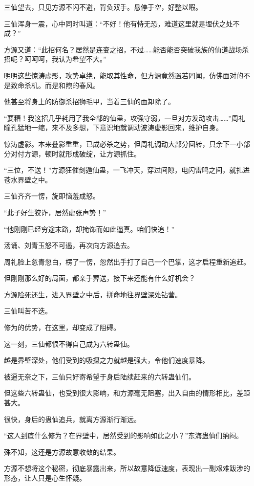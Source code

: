 \begin{this_body}
三仙望去，只见方源不闪不避，背负双手。悬停于空，好整以暇。

三仙浑身一震，心中同时叫道：“不好！他有恃无恐，难道这里就是埋伏之处不成？”

方源又道：“此招何名？居然是连变之招，不过……能否能否突破我族的仙道战场杀招呢？呵呵呵，我认为希望不大。”

明明这些惊涛虚影，攻势卓绝，能取其性命，但方源竟然置若罔闻，仿佛面对的不是致命杀机。而是和煦的春风。

他甚至将身上的防御杀招狮毛甲，当着三仙的面卸除了。

“要糟！我这招几乎耗用了我全部的仙蛊，攻强守弱，一旦对方发动攻击……”周礼瞳孔猛地一缩，来不及多想，下意识地就调动波涛虚影回来，维护自身。

惊涛虚影。本来叠影重重，已成必杀之势，但周礼调动大部分回转，只余下一小部分对付方源，顿时就形成破绽，让方源抓住。

“三位，不送！”方源狂催剑遁仙蛊，一飞冲天，穿过间隙，电闪雷鸣之间，就扎进苍水界壁之中。

三仙齐齐一愣，旋即恼羞成怒。

“此子好生狡诈，居然虚张声势！”

“他刚刚已经穷途末路，却掩饰而如此逼真。咱们快追！”

汤诵、刘青玉怒不可遏，再次向方源追去。

周礼脸上忽青忽白，楞了一愣，忽然出手打了自己一个巴掌，这才启程重新追赶。

但刚刚那么好的局面，都亲手葬送，接下来还能有什么好机会？

方源险死还生，进入界壁之中后，拼命地往界壁深处钻营。

三仙叫苦不迭。

修为的优势，在这里，却变成了阻碍。

这一刻，三仙都恨不得自己成为六转蛊仙。

越是界壁深处，他们受到的吸摄之力就越是强大，令他们速度暴降。

被逼无奈之下，三仙只好寄希望于身后陆续赶来的六转蛊仙们。

但这些六转蛊仙，也受到很大影响，和方源毫无阻塞，出入自由的情形相比，差距甚大。

很快，身后的蛊仙追兵，就离方源渐行渐远。

“这人到底什么修为？在界壁中，居然受到的影响如此之小？”东海蛊仙们纳闷。

殊不知，这还是方源故意收敛的结果。

方源不想将这个秘密，彻底暴露出来，所以故意降低速度，表现出一副艰难跋涉的形态，让人只是心生怀疑。


\end{this_body}
